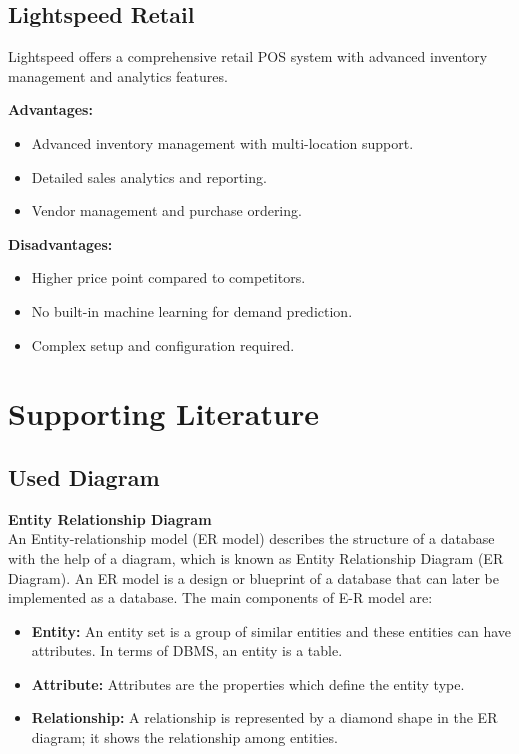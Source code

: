 \documentclass[12pt,a4paper]{report}
\begin{document}
\subsection{Lightspeed Retail}
Lightspeed offers a comprehensive retail POS system with advanced inventory management and analytics features.

\textbf{Advantages:}
\begin{itemize}
    \item Advanced inventory management with multi-location support.
    \item Detailed sales analytics and reporting.
    \item Vendor management and purchase ordering.
\end{itemize}

\textbf{Disadvantages:}
\begin{itemize}
    \item Higher price point compared to competitors.
    \item No built-in machine learning for demand prediction.
    \item Complex setup and configuration required.
\end{itemize}

\section{Supporting Literature}

\subsection{Used Diagram}

\textbf{Entity Relationship Diagram}\\
An Entity-relationship model (ER model) describes the structure of a database with the help of a diagram, which is known as Entity Relationship Diagram (ER Diagram). An ER model is a design or blueprint of a database that can later be implemented as a database. The main components of E-R model are:
\begin{itemize}
    \item \textbf{Entity:} An entity set is a group of similar entities and these entities can have attributes. In terms of DBMS, an entity is a table.
    \item \textbf{Attribute:} Attributes are the properties which define the entity type.
    \item \textbf{Relationship:} A relationship is represented by a diamond shape in the ER diagram; it shows the relationship among entities.
\end{itemize}
\end{document}
